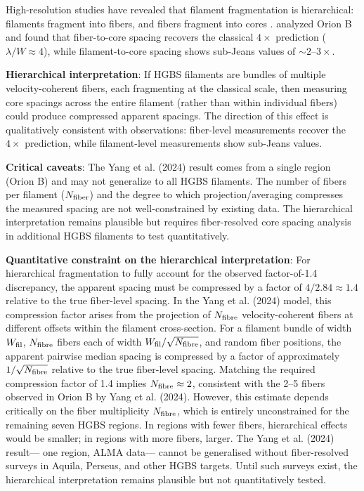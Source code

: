 \documentclass[twocolumn,usenatbib]{mnras}
\begin{document}
High-resolution studies have revealed that filament fragmentation is hierarchical: filaments fragment into fibers, and fibers fragment into cores \citep{Hacar2013, Hacar2018}. \citet{Yang2024} analyzed Orion B and found that fiber-to-core spacing recovers the classical $4\times$ prediction ($\lambda/W \approx 4$), while filament-to-core spacing shows sub-Jeans values of $\sim2$--$3\times$.

\textbf{Hierarchical interpretation}: If HGBS filaments are bundles of multiple velocity-coherent fibers, each fragmenting at the classical scale, then measuring core spacings across the entire filament (rather than within individual fibers) could produce compressed apparent spacings. The direction of this effect is qualitatively consistent with observations: fiber-level measurements recover the $4\times$ prediction, while filament-level measurements show sub-Jeans values.

\textbf{Critical caveats}: The Yang et al. (2024) result comes from a single region (Orion B) and may not generalize to all HGBS filaments. The number of fibers per filament ($N_{\rm fiber}$) and the degree to which projection/averaging compresses the measured spacing are not well-constrained by existing data. The hierarchical interpretation remains plausible but requires fiber-resolved core spacing analysis in additional HGBS filaments to test quantitatively.

\textbf{Quantitative constraint on the hierarchical interpretation}: For hierarchical fragmentation to fully account for the observed factor-of-1.4 discrepancy, the apparent spacing must be compressed by a factor of $4/2.84 \approx 1.4$ relative to the true fiber-level spacing. In the Yang et al. (2024) model, this compression factor arises from the projection of $N_{\rm fibre}$ velocity-coherent fibers at different offsets within the filament cross-section. For a filament bundle of width $W_{\rm fil}$, $N_{\rm fibre}$ fibers each of width $W_{\rm fil}/\sqrt{N_{\rm fibre}}$, and random fiber positions, the apparent pairwise median spacing is compressed by a factor of approximately $1/\sqrt{N_{\rm fibre}}$ relative to the true fiber-level spacing. Matching the required compression factor of 1.4 implies $N_{\rm fibre} \approx 2$, consistent with the 2--5 fibers observed in Orion B by Yang et al. (2024). However, this estimate depends critically on the fiber multiplicity $N_{\rm fibre}$, which is entirely unconstrained for the remaining seven HGBS regions. In regions with fewer fibers, hierarchical effects would be smaller; in regions with more fibers, larger. The Yang et al. (2024) result— one region, ALMA data— cannot be generalised without fiber-resolved surveys in Aquila, Perseus, and other HGBS targets. Until such surveys exist, the hierarchical interpretation remains plausible but not quantitatively tested.
\end{document}
